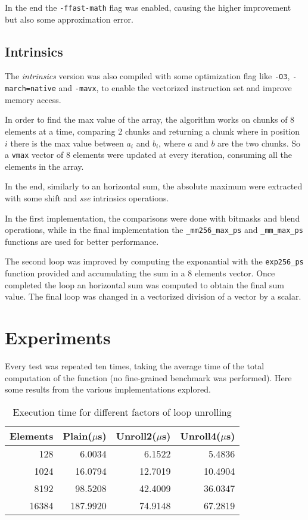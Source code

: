 \documentclass[12pt, a4paper]{article}
\begin{document}
In the end the \verb|-ffast-math| flag was enabled, causing the higher
improvement but also some approximation error.

\subsection{Intrinsics}

The \textit{intrinsics} version was also compiled with some optimization flag
like \verb|-O3|, \verb|-march=native| and \verb|-mavx|, to enable the vectorized
instruction set and improve memory access.

In order to find the max value of the array, the algorithm works on chunks of 8
elements at a time, comparing 2 chunks and returning a chunk where in position
$i$ there is the max value between $a_i$ and $b_i$, where $a$ and $b$ are the
two chunks. So a \verb|vmax| vector of 8 elements were updated at every
iteration, consuming all the elements in the array.

In the end, similarly to an horizontal sum, the absolute maximum were extracted
with some shift and \textit{sse} intrinsics operations.

In the first implementation, the comparisons were done with bitmasks and blend
operations, while in the final implementation the \verb|_mm256_max_ps| and
\verb|_mm_max_ps| functions are used for better performance.

The second loop was improved by computing the exponantial with the
\verb|exp256_ps| function provided and accumulating the sum in a 8 elements
vector. Once completed the loop an horizontal sum was computed to obtain the
final sum value. The final loop was changed in a vectorized division of a
vector by a scalar.

\section{Experiments}

Every test was repeated ten times, taking the average time of the total
computation of the function (no fine-grained benchmark was performed). Here
some results from the various implementations explored.

\begin{table}[H]
	\centering
	\begin{tabular}{rrrr}
		\toprule
		Elements & Plain($\mu$s) & Unroll2($\mu$s) & Unroll4($\mu$s) \\
		\midrule
		128      & 6.0034        & 6.1522          & 5.4836          \\
		1024     & 16.0794       & 12.7019         & 10.4904         \\
		8192     & 98.5208       & 42.4009         & 36.0347         \\
		16384    & 187.9920      & 74.9148         & 67.2819         \\
		\bottomrule
	\end{tabular}
	\caption{Execution time for different factors of loop unrolling}
\end{table}
\end{document}
